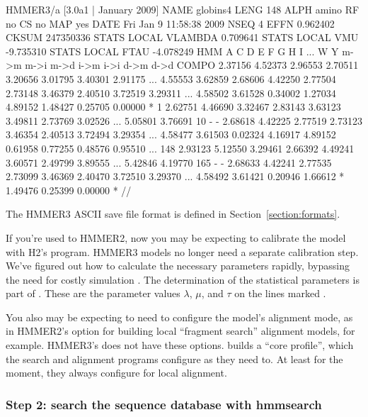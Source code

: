 \begin{sreoutput}
HMMER3/a [3.0a1 | January 2009]
NAME  globins4
LENG  148
ALPH  amino
RF    no
CS    no
MAP   yes
DATE  Fri Jan  9 11:58:38 2009
NSEQ  4
EFFN  0.962402
CKSUM 247350336
STATS LOCAL     VLAMBDA 0.709641
STATS LOCAL         VMU -9.735310
STATS LOCAL        FTAU -4.078249
HMM          A        C        D        E        F        G        H        I    ...   W        Y
            m->m     m->i     m->d     i->m     i->i     d->m     d->d
  COMPO   2.37156  4.52373  2.96553  2.70511  3.20656  3.01795  3.40301  2.91175 ... 4.55553  3.62859
          2.68606  4.42250  2.77504  2.73148  3.46379  2.40510  3.72519  3.29311 ... 4.58502  3.61528
          0.34002  1.27034  4.89152  1.48427  0.25705  0.00000        *
      1   2.62751  4.46690  3.32467  2.83143  3.63123  3.49811  2.73769  3.02526 ... 5.05801  3.76691     10 - -
          2.68618  4.42225  2.77519  2.73123  3.46354  2.40513  3.72494  3.29354 ... 4.58477  3.61503
          0.02324  4.16917  4.89152  0.61958  0.77255  0.48576  0.95510
...
    148   2.93123  5.12550  3.29461  2.66392  4.49241  3.60571  2.49799  3.89555 ... 5.42846  4.19770    165 - -
          2.68633  4.42241  2.77535  2.73099  3.46369  2.40470  3.72510  3.29370 ... 4.58492  3.61421
          0.20946  1.66612        *  1.49476  0.25399  0.00000        *
//
\end{sreoutput}

The HMMER3 ASCII save file format is defined in
Section~\ref{section:formats}.

If you're used to HMMER2, now you may be expecting to calibrate the
model with H2's  program. HMMER3 models no longer
need a separate calibration step. We've figured out how to calculate
the necessary parameters rapidly, bypassing the need for costly
simulation \citep{Eddy08}. The determination of the statistical
parameters is part of . These are the parameter values
$\lambda$, $\mu$, and $\tau$ on the lines marked .

You also may be expecting to need to configure the model's alignment
mode, as in HMMER2's  option for building local
``fragment search'' alignment models, for example. HMMER3's
 does not have these options.  builds a
``core profile'', which the search and alignment programs configure as
they need to. At least for the moment, they always configure for local
alignment.


\subsubsection{Step 2: search the sequence database with hmmsearch}

